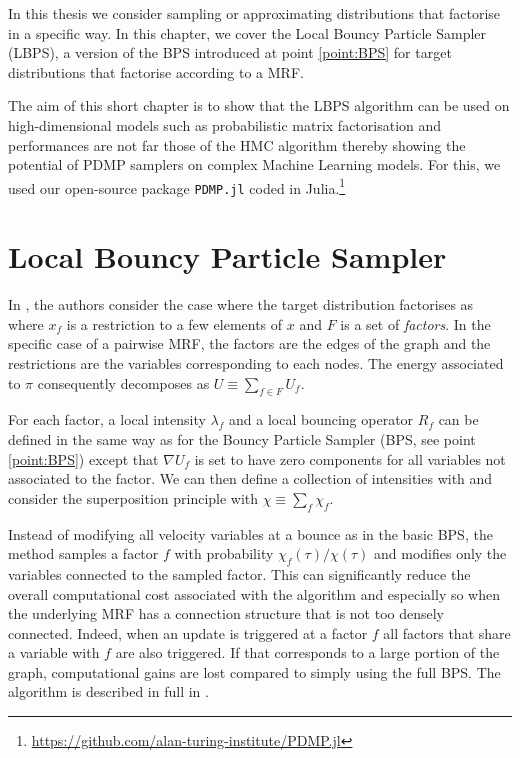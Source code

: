 
In this thesis we consider sampling or approximating distributions that factorise in a specific way. In this chapter, we cover the Local Bouncy Particle Sampler (LBPS), a version of the BPS introduced at point \ref{point:BPS} for target distributions that factorise according to a MRF.

The aim of this short chapter is to show that the LBPS algorithm can be used on high-dimensional models such as probabilistic matrix factorisation and performances are not far those of the HMC algorithm thereby showing the potential of PDMP samplers on complex Machine Learning models. For this, we used our open-source package \texttt{PDMP.jl} coded in Julia.\footnote{\url{https://github.com/alan-turing-institute/PDMP.jl}} 

\section{Local Bouncy Particle Sampler}
In \cite{bouchard15}, the authors consider the case where the target distribution factorises as
%
%
where $x_{f}$ is a restriction to a few elements of $x$ and $F$ is a set of \emph{factors}. In the specific case of a pairwise MRF, the factors are the edges of the graph and the restrictions are the variables corresponding to each nodes. The energy associated to $\pi$ consequently decomposes as $U\equiv \sum_{f\in F}U_{f}$.

For each factor, a local intensity $\lambda_{f}$ and a local bouncing operator $R_{f}$ can be defined in the same way as for the Bouncy Particle Sampler (BPS, see point \ref{point:BPS}) except that $\nabla U_{f}$ is set to have zero components for all variables not associated to the factor. We can then define a collection of intensities with
%
%
and consider the superposition principle with $\chi\equiv\sum_{f} \chi_{f}$.

Instead of modifying all velocity variables at a bounce as in the basic BPS, the method samples a factor $f$ with probability $\chi_{f}(\tau)/\chi(\tau)$ and modifies only the variables connected to the sampled factor. 
This can significantly reduce the overall computational cost associated with the algorithm and especially so when the underlying MRF has a connection structure that is not too densely connected. Indeed, when an update is triggered at a factor $f$ all factors that share a variable with $f$ are also triggered. If that corresponds to a large portion of the graph, computational gains are lost compared to simply using the full BPS. The algorithm is described in full in \citep[chapter 3.3]{bouchard15}.

